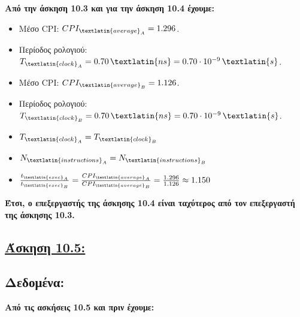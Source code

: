 \documentclass{article}
\begin{document}
\textbf{Από την άσκηση 10.3 και για την άσκηση 10.4 έχουμε:}
\begin{itemize}
    \item {Μέσο} \textlatin{CPI}: \( CPI_{\textlatin{average}_A} = 1.296 \).
    \item {Περίοδος ρολογιού}: \( T_{\textlatin{clock}_A} = 0.70 \, \textlatin{ns} = 0.70 \cdot 10^{-9} \, \textlatin{s} \).
\end{itemize}
\begin{itemize}
    \item {Μέσο} \textlatin{CPI}: \( CPI_{\textlatin{average}_B} = 1.126 \).
    \item {Περίοδος ρολογιού}: \( T_{\textlatin{clock}_B} = 0.70 \, \textlatin{ns} = 0.70 \cdot 10^{-9} \, \textlatin{s} \).
    \item \( T_{\textlatin{clock}_A} = T_{\textlatin{clock}_B}\)
    \item \( N_{\textlatin{instructions}_A} = N_{\textlatin{instructions}_B} \)
    \item $ \frac{t_{\textlatin{exec}_A}}{t_{\textlatin{exec}_B}} = \frac{CPI_{\textlatin{average}_A}}{CPI_{\textlatin{average}_B}} = \frac{1.296}{1.126} \approx 1.150 $
\end{itemize}
\textbf{Έτσι, ο επεξεργαστής της άσκησης 10.4 είναι ταχύτερος από τον επεξεργαστή της άσκησης 10.3.}












\newpage 
\subsection*{\underline{\textbf{Άσκηση 10.5:}}}
\vspace{0.75cm}





\subsection*{\textbf{Δεδομένα:}}

\textbf{Από τις ασκήσεις 10.5 και πριν έχουμε:}
\end{document}
